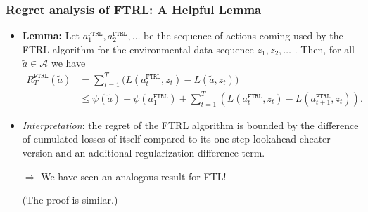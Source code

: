 \documentclass[11pt,compress,t,notes=noshow, xcolor=table]{beamer}
\renewcommand{\l}{L}
\newcommand{\Aspace}{\mathcal{A}}
\newcommand{\FTRL}{\texttt{FTRL}}
\newcommand{\reg}{\psi}
\begin{document}
\begin{frame} 
	\frametitle{Regret analysis of FTRL: A Helpful Lemma}
	\small
	\begin{itemize}
		\item \textbf{Lemma:}
		Let $a_1^{\FTRL}, a_2^{\FTRL}, \ldots$ be the sequence of actions coming used by the FTRL algorithm for the environmental data sequence $z_1,z_2,\ldots$ . 
		 Then, for all $\tilde a \in \Aspace$ we have
		\begin{equation*}
			\begin{split}
				R_T^{\FTRL}(\tilde a) &= \sum\limits_{t=1}^T \big(\l(a_t^{\FTRL},z_t) - \l(\tilde a,z_t) \big)
				\\ &\leq \reg(\tilde a) - \reg(a_1^{\FTRL}) +\sum\limits_{t=1}^T \left(\l(a_t^{\FTRL},z_t) - \l(a_{t+1}^{\FTRL},z_t)\right).
			\end{split}
		\end{equation*}
		  \item \emph{Interpretation}: the regret of the FTRL algorithm is bounded by the difference of cumulated losses of itself compared to its one-step lookahead cheater version and an additional regularization difference term. 
		  \item [$\Rightarrow$] We have seen an analogous result for FTL!
		  
		  {\tiny (The proof is similar.)}
	\end{itemize}
\end{frame}
\end{document}
